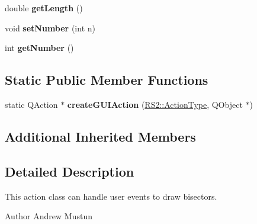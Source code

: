 \begin{DoxyCompactItemize}
\item 
\hypertarget{classRS__ActionDrawLineBisector_aec44a8fbcdf0f4d56a5962a512de10d8}{double {\bfseries get\-Length} ()}\label{classRS__ActionDrawLineBisector_aec44a8fbcdf0f4d56a5962a512de10d8}

\item 
\hypertarget{classRS__ActionDrawLineBisector_a6ab60e1b2900a56fc37ecdcc7fd7784f}{void {\bfseries set\-Number} (int n)}\label{classRS__ActionDrawLineBisector_a6ab60e1b2900a56fc37ecdcc7fd7784f}

\item 
\hypertarget{classRS__ActionDrawLineBisector_aea1fbdbfd01f189f99070f1ae8e30532}{int {\bfseries get\-Number} ()}\label{classRS__ActionDrawLineBisector_aea1fbdbfd01f189f99070f1ae8e30532}

\end{DoxyCompactItemize}
\subsection*{Static Public Member Functions}
\begin{DoxyCompactItemize}
\item 
\hypertarget{classRS__ActionDrawLineBisector_ac5b7d73da176deae85f6b308bc35bfaa}{static Q\-Action $\ast$ {\bfseries create\-G\-U\-I\-Action} (\hyperlink{classRS2_afe3523e0bc41fd637b892321cfc4b9d7}{R\-S2\-::\-Action\-Type}, Q\-Object $\ast$)}\label{classRS__ActionDrawLineBisector_ac5b7d73da176deae85f6b308bc35bfaa}

\end{DoxyCompactItemize}
\subsection*{Additional Inherited Members}


\subsection{Detailed Description}
This action class can handle user events to draw bisectors.

\begin{DoxyAuthor}{Author}
Andrew Mustun 
\end{DoxyAuthor}


